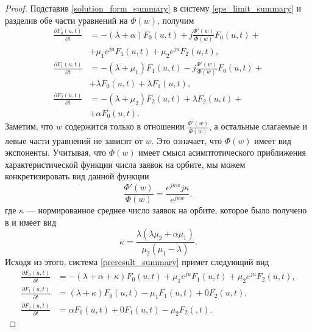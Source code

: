 \begin{proof}
	Подставив \eqref{solution_form_summary} в систему \eqref{eps_limit_summary} и разделив обе части уравнений на $\Phi(w)$, получим
	\begin{equation} \label{preresult_summary}
		\begin{split}
			\frac{{\partial F_{0}(u,t)}}{{\partial t}} &= -(\lambda + \alpha)F_{0}(u,t) + j
			\frac{\Phi'(w) }{\Phi(w)}F_{0}(u,t) +\\  &+ \mu_{1} e^{ju}F_{1}(u,t) + \mu_{2}e^{ju}F_{2}(u,t) ,
			\\
			\frac{{\partial F_{1}(u,t)}}{{\partial t}} &= -(\lambda + \mu_{1})F_{1}(u,t) - j 
			\frac{\Phi'(w) }{\Phi(w)}F_{0}(u,t) +\\  &+ \lambda F_{0}(u,t) + \lambda F_{1}(u,t) ,
			\\
			\frac{{\partial F_{2}(u,t)}}{{\partial t}} &= -(\lambda + \mu_{2})F_{2}(u,t)  + \lambda F_{2}(u,t) +\\  &+ \alpha F_{0}(u,t).
		\end{split}
	\end{equation} 
	Заметим, что $w$ содержится только в отношении $\frac{\Phi'(w) }{\Phi(w)}$, а остальные слагаемые и левые части уравнений не зависят от $w$. Это означает, что  $\Phi(w)$ имеет вид экспоненты. Учитывая, что  $\Phi(w)$ имеет смысл асимптотического приближения характеристической функции числа заявок на орбите, мы можем конкретизировать вид данной функции
	\begin{equation} \label{Phi_concrete}
		\frac{\Phi'(w) }{\Phi(w)} = \frac{e^{j\kappa w}j\kappa}{e^{j\kappa w}},
	\end{equation} 
	где $\kappa$ --- нормированное среднее число заявок на орбите, которое было получено в \cite{nazarov2017asymptotic} и имеет вид 
	\begin{equation*}
		\kappa = \frac{\lambda(\lambda \mu_{2} + \alpha \mu_{1})}{\mu_{2}(\mu_{1} - \lambda)}.
	\end{equation*}
	Исходя из этого, система \eqref{preresult_summary} примет следующий вид
	\begin{equation} \label{result_summary}
		\begin{split}
			\frac{{\partial F_{0}(u,t)}}{{\partial t}} &= -(\lambda + \alpha+ \kappa)F_{0}(u,t) + \mu_{1} e^{ju}F_{1}(u,t) + \mu_{2}e^{ju}F_{2}(u,t) ,
			\\
			\frac{{\partial F_{1}(u,t)}}{{\partial t}} &= (\lambda + \kappa)F_{0}(u,t) -  
			\mu_{1}F_{1}(u,t) +  0F_{2}(u,t) ,
			\\
			\frac{{\partial F_{2}(u,t)}}{{\partial t}} &= \alpha F_{0}(u,t)   +  0F_{1}(u,t) - \mu_{2}F_{2}(,t).
		\end{split}
	\end{equation}  


\end{proof}
